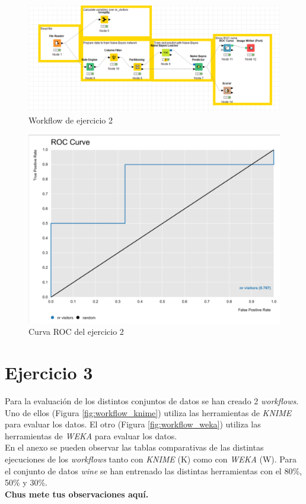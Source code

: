 \documentclass[10pt,a4paper]{article}
\begin{document}
\begin{figure}[h!]
	\centering
	\includegraphics[scale=0.5]{images/workflow_ej2.png}
	\caption{Workflow de ejercicio 2}
	\label{fig:workflow_ej2}
\end{figure}

\begin{figure}[h!]
	\centering
	\includegraphics[scale=0.5]{images/curva_ROC.png}
	\caption{Curva ROC del ejercicio 2}
	\label{fig:curvaROC_ej2}
\end{figure}


\section{Ejercicio 3}

Para la evaluación de los distintos conjuntos de datos se han creado 2 \emph{workflows}. Uno de ellos (Figura \ref{fig:workflow_knime}) utiliza las herramientas de \emph{KNIME} para evaluar los datos. El otro (Figura \ref{fig:workflow_weka}) utiliza las herramientas de \emph{WEKA} para evaluar los datos.\\
En el anexo se pueden observar las tablas comparativas de las distintas ejecuciones de los \emph{workflows} tanto con \emph{KNIME} (K) como con \emph{WEKA} (W).
Para el conjunto de datos \emph{wine} se han entrenado las distintas herramientas con el 80\%, 50\% y 30\%.\\
{\LARGE \textbf{Chus mete tus observaciones aquí.}}\\
\end{document}
